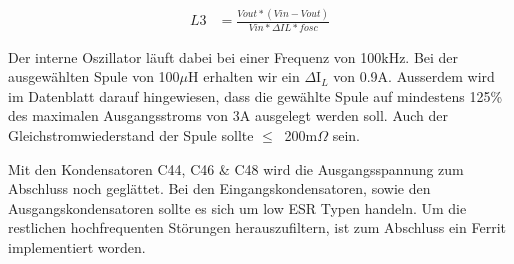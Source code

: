 \begin{align}
L3 &= \frac{Vout*(Vin-Vout)}{Vin*\Delta IL*fosc}
\label{equ:12V_Spulenberechnung}
\end{align}

Der interne Oszillator läuft dabei bei einer Frequenz von 100kHz. Bei der ausgewählten Spule von 100$\mu$H erhalten wir ein $\Delta$I$_{L}$ von 0.9A. Ausserdem wird im Datenblatt darauf hingewiesen, dass die gewählte Spule auf mindestens 125\% des maximalen Ausgangsstroms von 3A ausgelegt werden soll. Auch der Gleichstromwiederstand der Spule sollte $ \leq \ $ 200m$\Omega$  sein. 

Mit den Kondensatoren C44, C46 \& C48 wird die Ausgangsspannung zum Abschluss noch geglättet. Bei den Eingangskondensatoren, sowie den Ausgangskondensatoren sollte es sich um low ESR Typen handeln. Um die restlichen hochfrequenten Störungen herauszufiltern, ist zum Abschluss ein Ferrit implementiert worden.

